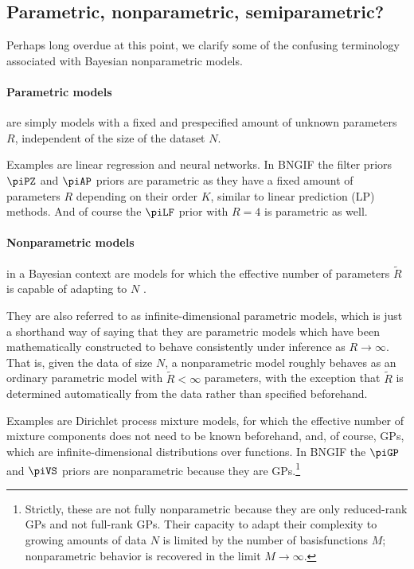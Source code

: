 \begin{chapterappendices}{5}

\section{Parametric, nonparametric, semiparametric?}

Perhaps long overdue at this point, we clarify some of the confusing terminology associated with Bayesian nonparametric models.

\paragraph{Parametric models}
are simply models with a fixed and prespecified amount of unknown parameters $R$, independent of the size of the dataset $N$.

Examples are linear regression and neural networks.
In BNGIF the filter priors $\piPZ$ and $\piAP$ priors are parametric as they have a fixed amount of parameters $R$ depending on their order $K$, similar to linear prediction (LP) methods.
And of course the $\piLF$ prior with $R = 4$ is parametric as well.

\paragraph{Nonparametric models}
in a Bayesian context are models for which the effective number
of parameters $\tilde R$ is capable of adapting to $N$ \citep{Orbanz2010}.

They are also referred to as infinite-dimensional parametric models, which is just a shorthand way of saying that they are parametric models which have been mathematically constructed to behave consistently under inference as $R \rightarrow \infty$.
That is, given the data of size $N$, a nonparametric model roughly behaves as an ordinary parametric model with $\tilde R < \infty$ parameters, with the exception that $\tilde R$ is determined automatically from the data rather than specified beforehand.

Examples are Dirichlet process mixture models, for which the effective number of mixture components does not need to be known beforehand, and, of course, GPs, which are infinite-dimensional distributions over functions.
In BNGIF the $\piGP$ and $\piVS$ priors are nonparametric because they are GPs.\footnote{%
Strictly, these are not fully nonparametric because they are only reduced-rank GPs and not full-rank GPs.
Their capacity to adapt their complexity to growing amounts of data $N$ is limited by the number of basisfunctions $M$;
nonparametric behavior is recovered in the limit $M \rightarrow \infty$.
}


\end{chapterappendices}
